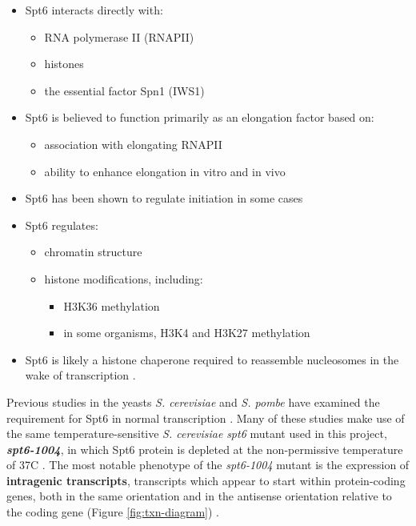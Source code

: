 \begin{itemize}[nosep, topsep=.5em]
\item Spt6 interacts directly with:
	\begin{itemize}[nosep]
	\item RNA polymerase II (RNAPII) \citep{close2011, diebold2011, liu2011, sdano2017, sun2010, yoh2007}
	\item histones \citep{bortvin1996, mccullough2015}
	\item the essential factor Spn1 (IWS1) \citep{diebold2010b, li2018, mcdonald2010}
	\end{itemize}
\item Spt6 is believed to function primarily as an elongation factor based on:
	\begin{itemize}[nosep]
	\item association with elongating RNAPII \citep{andrulis2000, ivanovska2011, kaplan2000, mayer2010}
	\item ability to enhance elongation in vitro \citep{endoh2004} and in vivo \citep{ardehali2009}
	\end{itemize}
\item Spt6 has been shown to regulate initiation in some cases \citep{adkins2006, ivanovska2011}
\item Spt6 regulates:
	\begin{itemize}[nosep]
	\item chromatin structure \citep{bortvin1996, degennaro2013, ivanovska2011, jeronimo2015, kaplan2003, perales2013, vanbakel2013}
	\item histone modifications, including:
		\begin{itemize}[nosep]
		\item H3K36 methylation \citep{carrozza2005, chu2006, yoh2008, youdell2008}
		\item in some organisms, H3K4 and H3K27 methylation \citep{begum2012, chen2012, degennaro2013, wang2017, wang2013}
		\end{itemize}
	\end{itemize}
\item Spt6 is likely a histone chaperone required to reassemble nucleosomes in the wake of transcription \citep{duina2011}.
\end{itemize}

Previous studies in the yeasts \textit{S. cerevisiae} and \textit{S. pombe} have examined the requirement for Spt6 in normal transcription \citep{cheung2008, degennaro2013, kaplan2003, pathak2018, uwimana2017, vanbakel2013}.
Many of these studies make use of the same temperature-sensitive \textit{S. cerevisiae} \textit{spt6} mutant used in this project, \textbf{\textit{spt6-1004}}, in which Spt6 protein is depleted at the non-permissive temperature of 37\textdegree C \citep{kaplan2003}.
The most notable phenotype of the \textit{spt6-1004} mutant is the expression of \textbf{intragenic transcripts}, transcripts which appear to start within protein-coding genes, both in the same orientation and in the antisense orientation relative to the coding gene (Figure \ref{fig:txn-diagram}) \citep{cheung2008, degennaro2013, kaplan2003, uwimana2017}.

